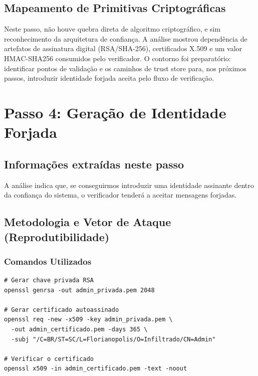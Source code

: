 \documentclass[12pt,a4paper]{article}
\begin{document}
\subsection{Mapeamento de Primitivas Criptográficas}

Neste passo, não houve quebra direta de algoritmo criptográfico, e sim reconhecimento da arquitetura de confiança.
A análise mostrou dependência de artefatos de assinatura digital (RSA/SHA-256), certificados X.509 e um valor HMAC-SHA256 consumidos pelo verificador.
O contorno foi preparatório: identificar pontos de validação e os caminhos de trust store para, nos próximos passos, introduzir identidade forjada aceita pelo fluxo de verificação.



\section{Passo 4: Geração de Identidade Forjada}

\subsection{Informações extraídas neste passo}

A análise indica que, se conseguirmos introduzir uma identidade assinante dentro da confiança do sistema, o verificador tenderá a aceitar mensagens forjadas.

\subsection{Metodologia e Vetor de Ataque (Reprodutibilidade)}

\subsubsection{Comandos Utilizados}

\begin{lstlisting}[caption=Gerar chave privada e certificado]
# Gerar chave privada RSA
openssl genrsa -out admin_privada.pem 2048

# Gerar certificado autoassinado
openssl req -new -x509 -key admin_privada.pem \
  -out admin_certificado.pem -days 365 \
  -subj "/C=BR/ST=SC/L=Florianopolis/O=Infiltrado/CN=Admin"

# Verificar o certificado
openssl x509 -in admin_certificado.pem -text -noout
\end{lstlisting}
\end{document}
